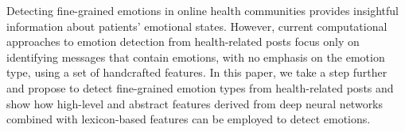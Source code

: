 Detecting fine-grained emotions in online health communities provides insightful information about patients' emotional states. However, current computational approaches to emotion detection from health-related posts focus only on identifying messages that contain emotions, with no emphasis on the emotion type, using a set of handcrafted features. In this paper, we take a step further and propose to detect fine-grained emotion types from health-related posts and show how high-level and abstract features derived from deep neural networks combined with lexicon-based features can be employed to detect emotions.
